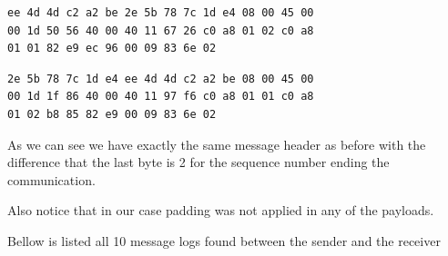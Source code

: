 \documentclass[paper=a4, fontsize=11pt]{scrartcl}
\numberwithin{equation}{section}		%
\numberwithin{figure}{section}			%
\numberwithin{table}{section}				%
\begin{document}
\begin{lstlisting}
ee 4d 4d c2 a2 be 2e 5b 78 7c 1d e4 08 00 45 00
00 1d 50 56 40 00 40 11 67 26 c0 a8 01 02 c0 a8
01 01 82 e9 ec 96 00 09 83 6e 02
\end{lstlisting}

\begin{lstlisting}
2e 5b 78 7c 1d e4 ee 4d 4d c2 a2 be 08 00 45 00
00 1d 1f 86 40 00 40 11 97 f6 c0 a8 01 01 c0 a8
01 02 b8 85 82 e9 00 09 83 6e 02              
\end{lstlisting}

As we can see we have exactly the same message header as before
with the difference that the last byte is 2 for the sequence number ending the communication.

Also notice that in our case padding was not applied in any of the payloads.

Bellow is listed all 10 message logs found between the sender
and the receiver
\end{document}
